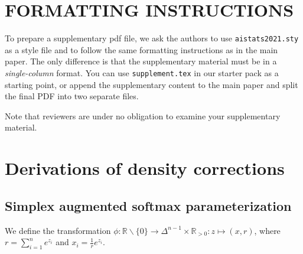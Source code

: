 \documentclass[twoside]{article}
\begin{document}
%

%

\onecolumn
{}

\section{FORMATTING INSTRUCTIONS}

To prepare a supplementary pdf file, we ask the authors to use \texttt{aistats2021.sty} as a style file and to follow the same formatting instructions as in the main paper.
The only difference is that the supplementary material must be in a \emph{single-column} format.
You can use \texttt{supplement.tex} in our starter pack as a starting point, or append the supplementary content to the main paper and split the final PDF into two separate files.

Note that reviewers are under no obligation to examine your supplementary material.

\section{Derivations of density corrections}

\subsection{Simplex augmented softmax parameterization}

We define the transformation $\phi: \mathbb{R} \backslash \{0\} \to \Delta^{n-1} \times \mathbb{R}_{>0}: z \mapsto (x, r)$,
where $r = \sum_{i=1}^n e^{z_i}$ and $x_i = \frac{1}{r} e^{z_i}$.
\end{document}
